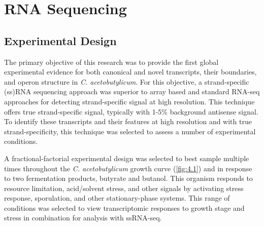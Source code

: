 
\chapter{RNA Sequencing}
\section{Experimental Design}
The primary objective of this research was to provide the first global experimental evidence for both canonical and novel transcripts, their boundaries, and operon structure in \textit{C. acetobutylicum}. For this objective, a strand-specific (ss)RNA sequencing approach was superior to array based and standard RNA-seq approaches for detecting strand-specific signal at high resolution. This technique offers true strand-specific signal, typically with 1-5\% background antisense signal.\cite{18} To identify these transcripts and their features at high resolution and with true strand-specificity, this technique was selected to assess a number of experimental conditions.

A fractional-factorial experimental design was selected to best sample multiple times throughout the \textit{C. acetobutylicum} growth curve (\ref{fig:4.1}) and in response to two fermentation products, butyrate and butanol. This organism responds to resource limitation, acid/solvent stress, and other signals by activating stress response, sporulation, and other stationary-phase systems.\cite{24,37,126} This range of conditions was selected to view transcriptomic responses to growth stage and stress in combination for analysis with ssRNA-seq. 

